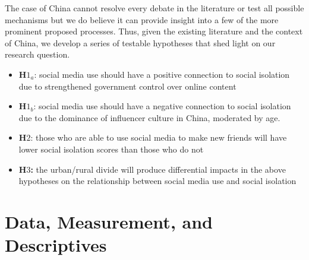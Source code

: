 \documentclass[
  letterpaper,
  DIV=11,
  numbers=noendperiod]{scrartcl}
\begin{document}
The case of China cannot resolve every debate in the literature or test
all possible mechanisms but we do believe it can provide insight into a
few of the more prominent proposed processes. Thus, given the existing
literature and the context of China, we develop a series of testable
hypotheses that shed light on our research question.

\begin{itemize}
\item
  \textbf{H\(1_a\)}: social media use should have a positive connection
  to social isolation due to strengthened government control over online
  content
\item
  \textbf{H\(1_b\)}: social media use should have a negative connection
  to social isolation due to the dominance of influencer culture in
  China, moderated by age.
\item
  \textbf{H\(2\)}: those who are able to use social media to make new
  friends will have lower social isolation scores than those who do not
\item
  \textbf{H\(3\):} the urban/rural divide will produce differential
  impacts in the above hypotheses on the relationship between social
  media use and social isolation
\end{itemize}

\section{Data, Measurement, and
Descriptives}\label{data-measurement-and-descriptives}
\end{document}
